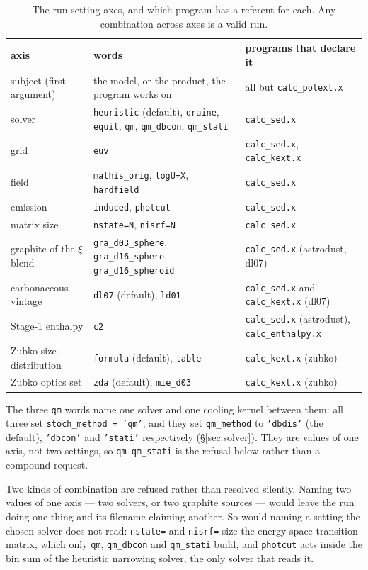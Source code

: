 \documentclass{my_memo}
\newcommand{\code}[1]{\texttt{#1}}
\begin{document}
\begin{table}[h]
\centering
\small
\begin{tabular}{@{}L{0.20\textwidth}L{0.34\textwidth}L{0.38\textwidth}@{}}
\toprule
axis & words & programs that declare it \\
\midrule
subject (first argument) &
the model, or the product, the program works on &
all but \code{calc\_polext.x} \\
solver &
\code{heuristic} (default), \code{draine}, \code{equil}, \code{qm},
\code{qm\_dbcon}, \code{qm\_stati} &
\code{calc\_sed.x} \\
grid &
\code{euv} &
\code{calc\_sed.x}, \code{calc\_kext.x} \\
field &
\code{mathis\_orig}, \code{logU=X}, \code{hardfield} &
\code{calc\_sed.x} \\
emission &
\code{induced}, \code{photcut} &
\code{calc\_sed.x} \\
matrix size &
\code{nstate=N}, \code{nisrf=N} &
\code{calc\_sed.x} \\
graphite of the $\xi$ blend &
\code{gra\_d03\_sphere}, \code{gra\_d16\_sphere}, \code{gra\_d16\_spheroid} &
\code{calc\_sed.x} (astrodust, dl07) \\
carbonaceous vintage &
\code{dl07} (default), \code{ld01} &
\code{calc\_sed.x} and \code{calc\_kext.x} (dl07) \\
Stage-1 enthalpy &
\code{c2} &
\code{calc\_sed.x} (astrodust), \code{calc\_enthalpy.x} \\
Zubko size distribution &
\code{formula} (default), \code{table} &
\code{calc\_kext.x} (zubko) \\
Zubko optics set &
\code{zda} (default), \code{mie\_d03} &
\code{calc\_kext.x} (zubko) \\
\bottomrule
\end{tabular}
\caption{The run-setting axes, and which program has a referent for each. Any
combination across axes is a valid run.}
\label{tab:runoptions}
\end{table}

The three \code{qm} words name one solver and one cooling kernel between them:
all three set \code{stoch\_method = 'qm'}, and they set \code{qm\_method} to
\code{'dbdis'} (the default), \code{'dbcon'} and \code{'stati'} respectively
(\S\ref{sec:solver}). They are values of one axis, not two settings, so
\code{qm qm\_stati} is the refusal below rather than a compound request.

Two kinds of combination are refused rather than resolved silently. Naming two
values of one axis --- two solvers, or two graphite sources --- would leave the
run doing one thing and its filename claiming another. So would naming a setting
the chosen solver does not read: \code{nstate=} and \code{nisrf=} size the
energy-space transition matrix, which only \code{qm}, \code{qm\_dbcon} and
\code{qm\_stati} build, and \code{photcut} acts inside the bin sum of the
heuristic narrowing solver, the only solver that reads it.
\end{document}
